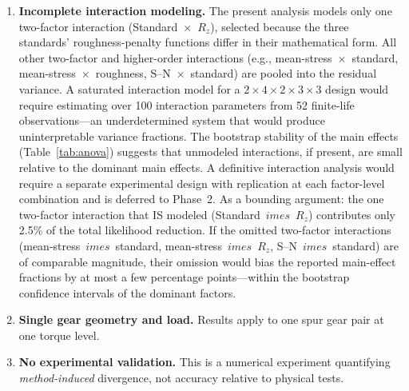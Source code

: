 \documentclass[12pt,a4paper]{article}
\begin{document}
\begin{enumerate}
        and the mean-stress correction contribution would be considerably
        smaller. Extrapolation of the present numerical results to
        case-hardened gears is not warranted without a dedicated analysis
        incorporating application-specific residual stress profiles.
  \item \textbf{Incomplete interaction modeling.} The present analysis
        models only one two-factor interaction (Standard~$\times$~$R_z$),
        selected because the three standards' roughness-penalty
        functions differ in their mathematical form. All other two-factor
        and higher-order interactions (e.g., mean-stress~$\times$~standard,
        mean-stress~$\times$~roughness, S--N~$\times$~standard) are pooled
        into the residual variance. A saturated interaction model for a
        $2\times4\times2\times3\times3$ design would require estimating
        over 100 interaction parameters from 52 finite-life
        observations---an underdetermined system that would produce
        uninterpretable variance fractions. The bootstrap stability of
        the main effects (Table~\ref{tab:anova}) suggests that unmodeled
        interactions, if present, are small relative to the dominant main
        effects. A definitive interaction analysis would require a
        separate experimental design with replication at each factor-level
        combination and is deferred to Phase~2. As a bounding argument:
        the one two-factor interaction that IS modeled
        (Standard~$	imes$~$R_z$) contributes only 2.5\% of the total
        likelihood reduction. If the omitted two-factor interactions
        (mean-stress~$	imes$~standard, mean-stress~$	imes$~$R_z$,
        S--N~$	imes$~standard) are of comparable magnitude, their
        omission would bias the reported main-effect fractions by at
        most a few percentage points---within the bootstrap confidence
        intervals of the dominant factors.
  \item \textbf{Single gear geometry and load.} Results apply to one spur
        gear pair at one torque level.
  \item \textbf{No experimental validation.} This is a numerical
        experiment quantifying \emph{method-induced} divergence, not
        accuracy relative to physical tests.
\end{enumerate}
\end{document}
